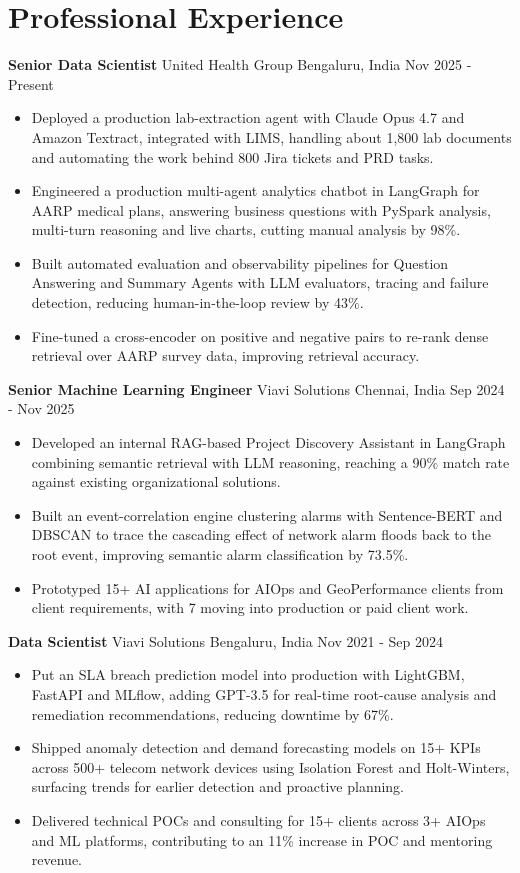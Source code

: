 \documentclass[10pt,a4paper]{article}
\newcommand{\role}[4]{\textbf{#1} \textbar{} #2 \hfill #3 \textbar{} #4\par}
\begin{document}
\section{Professional Experience}
\role{Senior Data Scientist}{United Health Group}{Bengaluru, India}{Nov 2025 - Present}
\begin{itemize}
  \item Deployed a production lab-extraction agent with Claude Opus 4.7 and Amazon Textract, integrated with LIMS, handling about 1,800 lab documents and automating the work behind 800 Jira tickets and PRD tasks.
  \item Engineered a production multi-agent analytics chatbot in LangGraph for AARP medical plans, answering business questions with PySpark analysis, multi-turn reasoning and live charts, cutting manual analysis by 98\%.
  \item Built automated evaluation and observability pipelines for Question Answering and Summary Agents with LLM evaluators, tracing and failure detection, reducing human-in-the-loop review by 43\%.
  \item Fine-tuned a cross-encoder on positive and negative pairs to re-rank dense retrieval over AARP survey data, improving retrieval accuracy.
\end{itemize}
\vspace{3pt}
\role{Senior Machine Learning Engineer}{Viavi Solutions}{Chennai, India}{Sep 2024 - Nov 2025}
\begin{itemize}
  \item Developed an internal RAG-based Project Discovery Assistant in LangGraph combining semantic retrieval with LLM reasoning, reaching a 90\% match rate against existing organizational solutions.
  \item Built an event-correlation engine clustering alarms with Sentence-BERT and DBSCAN to trace the cascading effect of network alarm floods back to the root event, improving semantic alarm classification by 73.5\%.
  \item Prototyped 15+ AI applications for AIOps and GeoPerformance clients from client requirements, with 7 moving into production or paid client work.
\end{itemize}
\vspace{3pt}
\role{Data Scientist}{Viavi Solutions}{Bengaluru, India}{Nov 2021 - Sep 2024}
\begin{itemize}
  \item Put an SLA breach prediction model into production with LightGBM, FastAPI and MLflow, adding GPT-3.5 for real-time root-cause analysis and remediation recommendations, reducing downtime by 67\%.
  \item Shipped anomaly detection and demand forecasting models on 15+ KPIs across 500+ telecom network devices using Isolation Forest and Holt-Winters, surfacing trends for earlier detection and proactive planning.
  \item Delivered technical POCs and consulting for 15+ clients across 3+ AIOps and ML platforms, contributing to an 11\% increase in POC and mentoring revenue.
\end{itemize}
\end{document}
